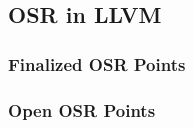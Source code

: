 \subsection{OSR in LLVM}

\subsubsection{Finalized OSR Points}

\subsubsection{Open OSR Points}
  
  